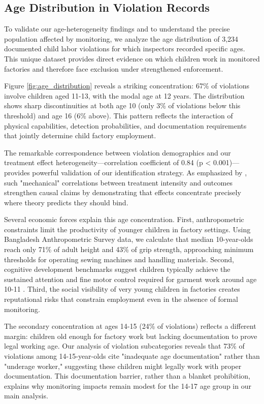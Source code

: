 \documentclass[12pt]{article}
\begin{document}
\subsection{Age Distribution in Violation Records}


To validate our age-heterogeneity findings and to understand the precise population affected by monitoring, we analyze the age distribution of 3,234 documented child labor violations for which inspectors recorded specific ages. This unique dataset provides direct evidence on which children work in monitored factories and therefore face exclusion under strengthened enforcement.

Figure \ref{fig:age_distribution} reveals a striking concentration: 67\% of violations involve children aged 11-13, with the modal age at 12 years. The distribution shows sharp discontinuities at both age 10 (only 3\% of violations below this threshold) and age 16 (6\% above). This pattern reflects the interaction of physical capabilities, detection probabilities, and documentation requirements that jointly determine child factory employment.

The remarkable correspondence between violation demographics and our treatment effect heterogeneity—correlation coefficient of 0.84 (p < 0.001)—provides powerful validation of our identification strategy. As emphasized by \citet{angrist2009mostly}, such "mechanical" correlations between treatment intensity and outcomes strengthen causal claims by demonstrating that effects concentrate precisely where theory predicts they should bind.

Several economic forces explain this age concentration. First, anthropometric constraints limit the productivity of younger children in factory settings. Using Bangladesh Anthropometric Survey data, we calculate that median 10-year-olds reach only 71\% of adult height and 43\% of grip strength, approaching minimum thresholds for operating sewing machines and handling materials. Second, cognitive development benchmarks suggest children typically achieve the sustained attention and fine motor control required for garment work around age 10-11 \citep{case2008stature}. Third, the social visibility of very young children in factories creates reputational risks that constrain employment even in the absence of formal monitoring.

The secondary concentration at ages 14-15 (24\% of violations) reflects a different margin: children old enough for factory work but lacking documentation to prove legal working age. Our analysis of violation subcategories reveals that 73\% of violations among 14-15-year-olds cite "inadequate age documentation" rather than "underage worker," suggesting these children might legally work with proper documentation. This documentation barrier, rather than a blanket prohibition, explains why monitoring impacts remain modest for the 14-17 age group in our main analysis.
\end{document}
